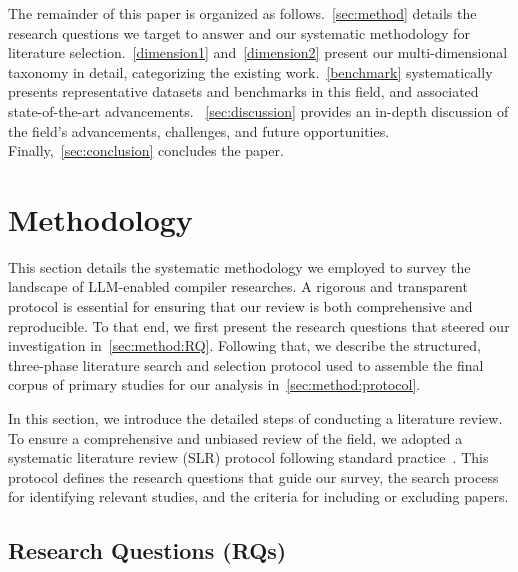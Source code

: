 \documentclass[pdflatex,sn-mathphys-ay,twocolumn, a4paper]{sn-jnl}%
\theoremstyle{thmstyleone}%
\theoremstyle{thmstyletwo}%
\theoremstyle{thmstylethree}%
\begin{document}
The remainder of this paper is organized as follows.~\autoref{sec:method} details the research questions we target to answer and our systematic methodology for literature selection.~\autoref{dimension1} and~\autoref{dimension2} present our multi-dimensional taxonomy in detail, categorizing the existing work.~\autoref{benchmark} systematically presents representative datasets and benchmarks in this field, and associated state-of-the-art advancements.
~\autoref{sec:discussion} provides an in-depth discussion of the field's advancements, challenges, and future opportunities. Finally,~\autoref{sec:conclusion} concludes the paper.

\section{Methodology}\label{sec:method}

This section details the systematic methodology we employed to survey the landscape of LLM-enabled compiler researches. A rigorous and transparent protocol is essential for ensuring that our review is both comprehensive and reproducible. To that end, we first present the research questions that steered our investigation in~\autoref{sec:method:RQ}. Following that, we describe the structured, three-phase literature search and selection protocol used to assemble the final corpus of primary studies for our analysis in~\autoref{sec:method:protocol}.

In this section, we introduce the detailed steps of conducting a literature review. To ensure a comprehensive and unbiased review of the field, we adopted a systematic literature review (SLR) protocol following standard practice~\citep{literaturereview2007}. This protocol defines the research questions that guide our survey, the search process for identifying relevant studies, and the criteria for including or excluding papers.

\subsection{Research Questions (RQs)}\label{sec:method:RQ}
\end{document}
